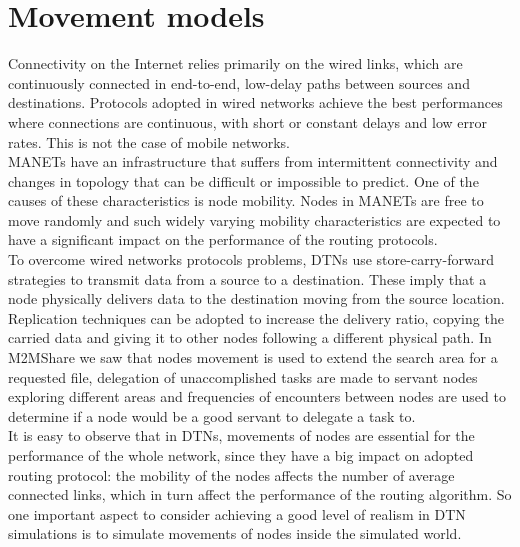 
\chapter{Movement models}\label{movimento} %




Connectivity on the Internet relies primarily on the wired links, which are continuously connected in end-to-end, low-delay paths between sources and destinations. Protocols adopted in wired networks achieve the best performances where connections are continuous, with short or constant delays and low error rates. This is not the case of mobile networks.
\\

MANETs have an infrastructure that suffers from intermittent connectivity and changes in topology that can be difficult or impossible to predict. One of the causes of these characteristics is node mobility. Nodes in MANETs are free to move randomly and such widely varying mobility characteristics are expected to have a significant impact on the performance of the routing protocols.
\\

To overcome wired networks protocols problems, DTNs use store-carry-forward strategies to transmit data from a source to a destination. These imply that a node physically delivers data to the destination moving from the source location. Replication techniques can be adopted to increase the delivery ratio, copying the carried data and giving it to other nodes following a different physical path. In M2MShare we saw that nodes movement is used to extend the search area for a requested file, delegation of unaccomplished tasks are made to servant nodes exploring different areas and frequencies of encounters between nodes are used to determine if a node would be a good servant to delegate a task to.
\\

It is easy to observe that in DTNs, movements of nodes are essential for the performance of the whole network, since they have a big impact on adopted routing protocol: the mobility of the nodes affects the number of average connected links, which in turn affect the performance of the routing algorithm.
So one important aspect to consider achieving a good level of realism in DTN simulations is to simulate movements of nodes inside the simulated world. 
\\

